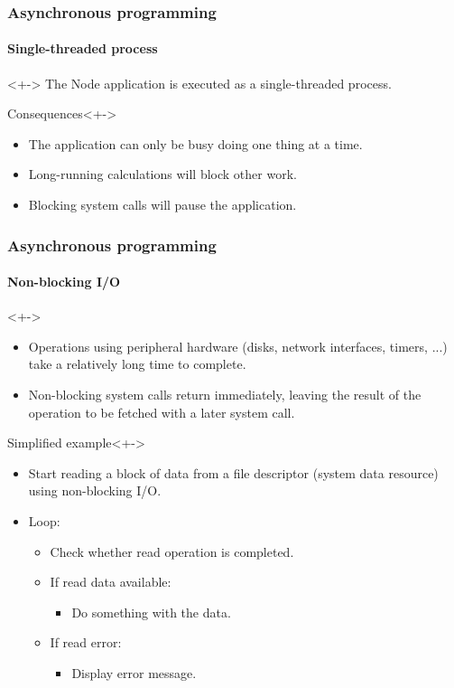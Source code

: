 \begin{frame}
	\frametitle{Asynchronous programming}
	\framesubtitle{Single-threaded process}

	\begin{block}{}<+->
		The Node application is executed as a \alert{single-threaded process}.
	\end{block}

	\begin{block}{Consequences}<+->
		\begin{itemize}[<+-| highlight@+>]
			\item The application can only be busy doing one thing at a time.
			\item Long-running calculations will block other work.
			\item Blocking system calls will pause the application.
		\end{itemize}
	\end{block}
\end{frame}


\begin{frame}
	\frametitle{Asynchronous programming}
	\framesubtitle{Non-blocking I/O}

	\begin{block}{}<+->
		\begin{itemize}[<+-| highlight@+>]
			\item Operations using peripheral hardware (disks, network interfaces, timers, ...) take a relatively long time to complete.
			\item Non-blocking system calls return immediately, leaving the result of the operation to be fetched with a later system call.
		\end{itemize}
	\end{block}

	\begin{block}{Simplified example}<+->
		\begin{itemize}[<+->]
			\item Start reading a block of data from a file descriptor (system data resource) using non-blocking I/O.
			\item Loop:
			\begin{itemize}[<+->]
				\item Check whether read operation is completed.
				\item If read data available:
				\begin{itemize}[<+->]
					\item Do something with the data.
				\end{itemize}
				\item If read error:
				\begin{itemize}[<+->]
					\item Display error message.
				\end{itemize}
			\end{itemize}
		\end{itemize}
	\end{block}
\end{frame}


